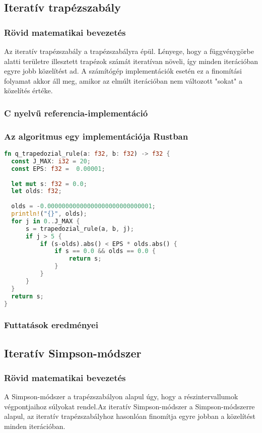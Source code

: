 \subsection{Iteratív trapézszabály}
\subsubsection{Rövid matematikai bevezetés}
Az iteratív trapézszabály a trapézszabályra épül. Lényege, hogy a függvénygörbe alatti területre illesztett trapézok számát iteratívan növeli, így minden iterációban egyre jobb közelítést ad. A számítógép implementációk esetén ez a finomítási folyamat akkor áll meg, amikor az elmúlt iterációban nem változott "sokat" a közelítés értéke.
\subsubsection{C nyelvű referencia-implementáció}
\begin{cppstyle}
\end{cppstyle}
\subsubsection{Az algoritmus egy implementációja Rustban}
\begin{lstlisting}[language=Rust]
fn q_trapedozial_rule(a: f32, b: f32) -> f32 {
  const J_MAX: i32 = 20;
  const EPS: f32 =  0.00001;
  
  let mut s: f32 = 0.0;
  let olds: f32;
  
  olds = -0.00000000000000000000000000001;
  println!("{}", olds);
  for j in 0..J_MAX {
	  s = trapedozial_rule(a, b, j);
	  if j > 5 {
		  if (s-olds).abs() < EPS * olds.abs() {
			  if s == 0.0 && olds == 0.0 {
				  return s;
			  }
		  }
	  }
  }
  return s;
}
\end{lstlisting}

\subsubsection{Futtatások eredményei} %

\subsection{Iteratív Simpson-módszer}
\subsubsection{Rövid matematikai bevezetés}
A Simpson-módszer a trapézszabályon alapul úgy, hogy a részintervallumok végpontjaihoz súlyokat rendel.Az iteratív Simpson-módszer a Simpson-módszerre alapul, az iteratív trapézszabályhoz hasonlóan finomítja egyre jobban a közelítést minden iterációban.
